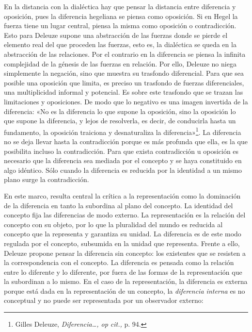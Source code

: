 En la distancia con la dialéctica hay que pensar la distancia entre diferencia y oposición, pues la diferencia hegeliana se piensa como oposición. Si en Hegel la fuerza tiene un lugar central, piensa la misma como oposición o contradicción. Esto para Deleuze supone una abstracción de las fuerzas donde se pierde el elemento real del que proceden las fuerzas, esto es, la dialéctica se queda en la abstracción de las relaciones. Por el contrario en la diferencia se piensa la infinita complejidad de la génesis de las fuerzas en relación. Por ello, Deleuze no niega simplemente la negación, sino que muestra su trasfondo diferencial. Para que sea posible una oposición que limita, es preciso un trasfondo de fuerzas diferenciales, una multiplicidad informal y potencial. Es sobre este trasfondo que se trazan las limitaciones y oposiciones. De modo que lo negativo es una imagen invertida de la diferencia: «No es la diferencia lo que supone la oposición, sino la oposición lo que supone la diferencia, y lejos de resolverla, es decir, de conducirla hasta un fundamento, la oposición traiciona y desnaturaliza la diferencia»\footnote{Gilles Deleuze, \emph{Diferencia\ldots, op cit.,} p. 94.}. La diferencia no se deja llevar hasta la contradicción porque es más profunda que ella, es la que posibilita incluso la contradicción. Para que exista contradicción u oposición es necesario que la diferencia sea mediada por el concepto y se haya constituido en algo idéntico. Sólo cuando la diferencia es reducida por la identidad a un mismo plano surge la contradicción.

En este marco, resulta central la crítica a la representación como la dominación de la diferencia en tanto la subordina al plano del concepto. La identidad del concepto fija las diferencias de modo externo. La representación es la relación del concepto con su objeto, por lo que la pluralidad del mundo es reducida al concepto que la representa y garantiza su unidad. La diferencia es de este modo regulada por el concepto, subsumida en la unidad que representa. Frente a ello, Deleuze propone pensar la diferencia sin concepto: los existentes que se resisten a la correspondencia con el concepto. La diferencia es pensada como la relación entre lo diferente y lo diferente, por fuera de las formas de la representación que la subordinan a lo mismo. En el caso de la representación, la diferencia es externa porque está dada en la representación de un concepto, la \emph{diferencia interna} es no conceptual y no puede ser representada por un observador externo:

